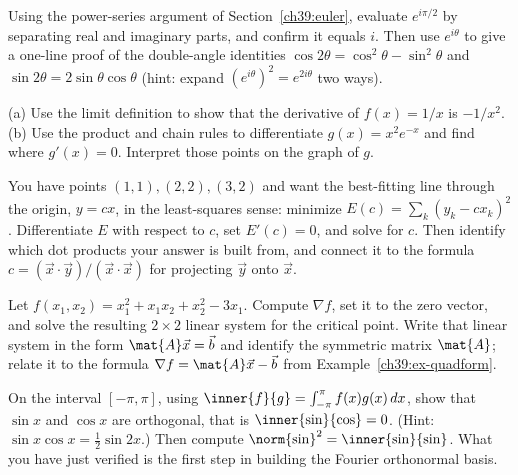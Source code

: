 \begin{exercise}
\label{ch39:ex6}
Using the power-series argument of Section~\ref{ch39:euler}, evaluate $e^{i\pi/2}$ by separating real
and imaginary parts, and confirm it equals $i$. Then use $e^{i\theta}$ to give a one-line proof of
the double-angle identities $\cos 2\theta = \cos^2\theta - \sin^2\theta$ and $\sin 2\theta =
2\sin\theta\cos\theta$ (hint: expand $(e^{i\theta})^2 = e^{2i\theta}$ two ways).
\end{exercise}

\begin{exercise}
\label{ch39:ex7}
(a) Use the limit definition to show that the derivative of $f(x) = 1/x$ is $-1/x^2$.
(b) Use the product and chain rules to differentiate $g(x) = x^2 e^{-x}$ and find where $g'(x)=0$.
Interpret those points on the graph of $g$.
\end{exercise}

\begin{exercise}
\label{ch39:ex8}
You have points $(1,1), (2,2), (3,2)$ and want the best-fitting line through the origin, $y = cx$, in
the least-squares sense: minimize $E(c) = \sum_{k}(y_k - c x_k)^2$. Differentiate $E$ with respect to
$c$, set $E'(c) = 0$, and solve for $c$. Then identify which dot products your answer is built from,
and connect it to the formula $c = (\vec{x}\cdot\vec{y})/(\vec{x}\cdot\vec{x})$ for projecting
$\vec{y}$ onto $\vec{x}$.
\end{exercise}

\begin{exercise}
\label{ch39:ex9}
Let $f(x_1,x_2) = x_1^2 + x_1 x_2 + x_2^2 - 3x_1$. Compute $\nabla f$, set it to the zero vector, and
solve the resulting $2\times 2$ linear system for the critical point. Write that linear system in the
form $\mat{A}\vec{x} = \vec{b}$ and identify the symmetric matrix $\mat{A}$; relate it to the
formula $\nabla f = \mat{A}\vec{x} - \vec{b}$ from Example~\ref{ch39:ex-quadform}.
\end{exercise}

\begin{exercise}
\label{ch39:ex10}
On the interval $[-\pi, \pi]$, using $\inner{f}{g} = \int_{-\pi}^{\pi} f(x)g(x)\,dx$, show that
$\sin x$ and $\cos x$ are orthogonal, that is $\inner{\sin}{\cos} = 0$. (Hint: $\sin x\cos x =
\tfrac12\sin 2x$.) Then compute $\norm{\sin}^2 = \inner{\sin}{\sin}$. What you have just verified is
the first step in building the Fourier orthonormal basis.
\end{exercise}

